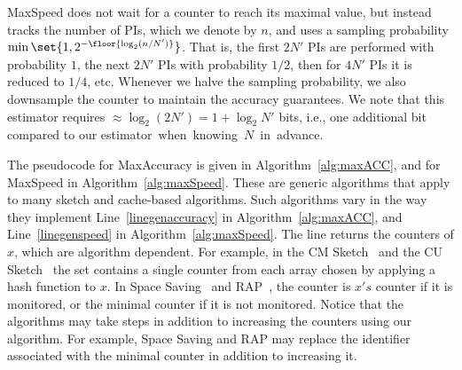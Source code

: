 {\sc MaxSpeed} does not wait for a counter to reach its maximal value, but instead tracks the number of PIs, which we denote by $n$, and uses a sampling probability $\min\set{1,2^{-\floor{\log_2 (n/ N')}}}$.
That is, the first $2N'$ PIs are performed with probability $1$, the next $2N'$ PIs with probability $1/2$, then for $4N'$ PIs it is reduced to $1/4$, etc.
Whenever we halve the sampling probability, we also downsample the counter to maintain the accuracy guarantees. We note that this estimator requires $\approx \log_2(2N')=1+\log_2 N'$ bits, i.e., one additional bit compared to our \mbox{estimator when knowing $N$ in advance.}

The pseudocode for {\sc MaxAccuracy} is given in Algorithm~\ref{alg:maxACC}, and for {\sc MaxSpeed} in Algorithm~\ref{alg:maxSpeed}.  These are generic algorithms that apply to many sketch and cache-based algorithms. Such algorithms vary in the way they implement Line~\ref{linegenaccuracy} in Algorithm~\ref{alg:maxACC}, and Line~\ref{linegenspeed} in Algorithm~\ref{alg:maxSpeed}. The line returns the counters of $x$, which are algorithm dependent. For example, in the CM Sketch~\cite{CountMinSketch} and the CU Sketch~\cite{CUSketch} the set contains a single counter from each array chosen by applying a hash function to $x$. In Space Saving~\cite{SpaceSavings} and RAP~\cite{RAP}, the counter is $x's$ counter if it is monitored, or the minimal counter if it is not monitored. 
Notice that the algorithms may take steps in addition to increasing the counters using our algorithm. For example, Space Saving and RAP may replace the identifier associated with the minimal counter in addition to increasing it.%

